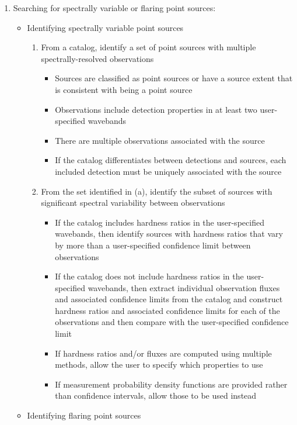 \begin{enumerate}
\item  Searching for spectrally variable or flaring point sources:
  \begin{itemize}
  \item Identifying spectrally variable point sources
    \begin{enumerate}
    \item From a catalog, identify a set of point sources with multiple spectrally-resolved observations
      \begin{itemize}
        \item Sources are classified as point sources or have a source extent that is consistent with being a point source
        \item Observations include detection properties in at least two user-specified wavebands
        \item There are multiple observations associated with the source
        \item If the catalog differentiates between detections and sources, each included detection must be uniquely associated with the source
      \end{itemize}
    \item From the set identified in (a), identify the subset of sources with significant spectral variability between observations
      \begin{itemize}
      \item If the catalog includes hardness ratios in the user-specified wavebands, then identify sources with hardness ratios that vary by more than a user-specified confidence limit between observations
      \item If the catalog does not include hardness ratios in the user-specified wavebands, then extract individual observation fluxes and associated confidence limits from the catalog and construct hardness ratios and associated confidence limits for each of the observations and then compare with the user-specified confidence limit
      \item If hardness ratios and/or fluxes are computed using multiple methods, allow the user to specify which properties to use
      \item If measurement probability density functions are provided rather than confidence intervals, allow those to be used instead
      \end{itemize}
    \end{enumerate}
  \item Identifying flaring point sources

\end{itemize}
\end{enumerate}
